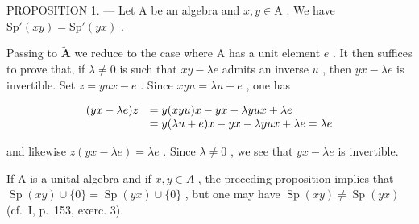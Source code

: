 PROPOSITION 1. --- Let A be an algebra and \(x, y \in \mathrm{A}\) . We have \(\mathrm{Sp}'(xy) = \mathrm{Sp}'(yx)\) .

Passing to \(\widetilde{\mathbf{A}}\) we reduce to the case where A has a unit element \(e\) . It then suffices to prove that, if \(\lambda \neq 0\) is such that \(xy - \lambda e\) admits an inverse \(u\) , then \(yx - \lambda e\) is invertible. Set \(z = yux - e\) . Since \(xyu = \lambda u + e\) , one has

\[
\begin{array}{r l} (y x - \lambda e) z & = y (x y u) x - y x - \lambda y u x + \lambda e \\ & = y (\lambda u + e) x - y x - \lambda y u x + \lambda e = \lambda e \end{array}
\]

and likewise \(z(yx - \lambda e) = \lambda e\) . Since \(\lambda \neq 0\) , we see that \(yx - \lambda e\) is invertible.

If A is a unital algebra and if \(x, y \in A\) , the preceding proposition implies that \(\operatorname{Sp}(xy) \cup \{0\} = \operatorname{Sp}(yx) \cup \{0\}\) , but one may have \(\operatorname{Sp}(xy) \neq \operatorname{Sp}(yx)\) (cf.~I, p.~153, exerc. 3).


